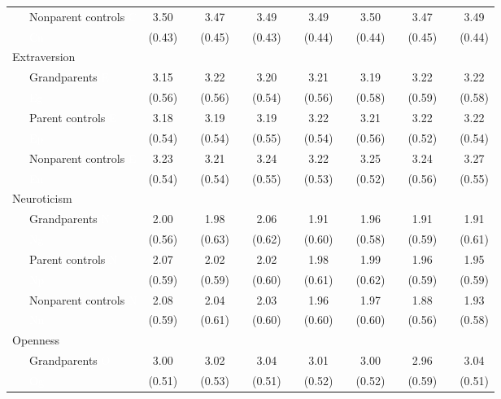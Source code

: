 \documentclass[
  english,
  man, noextraspace,floatsintext]{apa7}
\newenvironment{lltable}{\begin{landscape}\begin{center}\begin{ThreePartTable}}{\end{ThreePartTable}\end{center}\end{landscape}}
\begin{document}
\begin{appendix}
\begin{lltable}
{\begin{longtable}{lccccccccccccc}
\ \ \ Nonparent controls \textcolor{white}{C} & 3.50 &  & 3.47 &  & 3.49 &  & 3.49 &  & 3.50 &  & 3.47 &  & 3.49\\
\ \ \ \textcolor{white}{Cn} & (0.43) &  & (0.45) &  & (0.43) &  & (0.44) &  & (0.44) &  & (0.45) &  & (0.44)\\
Extraversion &  &  &  &  &  &  &  &  &  &  &  &  & \\
\ \ \ Grandparents \textcolor{white}{E} & 3.15 &  & 3.22 &  & 3.20 &  & 3.21 &  & 3.19 &  & 3.22 &  & 3.22\\
\ \ \ \textcolor{white}{Eg} & (0.56) &  & (0.56) &  & (0.54) &  & (0.56) &  & (0.58) &  & (0.59) &  & (0.58)\\
\ \ \ Parent controls \textcolor{white}{E} & 3.18 &  & 3.19 &  & 3.19 &  & 3.22 &  & 3.21 &  & 3.22 &  & 3.22\\
\ \ \ \textcolor{white}{Ep} & (0.54) &  & (0.54) &  & (0.55) &  & (0.54) &  & (0.56) &  & (0.52) &  & (0.54)\\
\ \ \ Nonparent controls \textcolor{white}{E} & 3.23 &  & 3.21 &  & 3.24 &  & 3.22 &  & 3.25 &  & 3.24 &  & 3.27\\
\ \ \ \textcolor{white}{En} & (0.54) &  & (0.54) &  & (0.55) &  & (0.53) &  & (0.52) &  & (0.56) &  & (0.55)\\
Neuroticism &  &  &  &  &  &  &  &  &  &  &  &  & \\
\ \ \ Grandparents \textcolor{white}{N} & 2.00 &  & 1.98 &  & 2.06 &  & 1.91 &  & 1.96 &  & 1.91 &  & 1.91\\
\ \ \ \textcolor{white}{Ng} & (0.56) &  & (0.63) &  & (0.62) &  & (0.60) &  & (0.58) &  & (0.59) &  & (0.61)\\
\ \ \ Parent controls \textcolor{white}{N} & 2.07 &  & 2.02 &  & 2.02 &  & 1.98 &  & 1.99 &  & 1.96 &  & 1.95\\
\ \ \ \textcolor{white}{Np} & (0.59) &  & (0.59) &  & (0.60) &  & (0.61) &  & (0.62) &  & (0.59) &  & (0.59)\\
\ \ \ Nonparent controls \textcolor{white}{N} & 2.08 &  & 2.04 &  & 2.03 &  & 1.96 &  & 1.97 &  & 1.88 &  & 1.93\\
\ \ \ \textcolor{white}{Nn} & (0.59) &  & (0.61) &  & (0.60) &  & (0.60) &  & (0.60) &  & (0.56) &  & (0.58)\\
Openness &  &  &  &  &  &  &  &  &  &  &  &  & \\
\ \ \ Grandparents \textcolor{white}{O} & 3.00 &  & 3.02 &  & 3.04 &  & 3.01 &  & 3.00 &  & 2.96 &  & 3.04\\
\ \ \ \textcolor{white}{Og} & (0.51) &  & (0.53) &  & (0.51) &  & (0.52) &  & (0.52) &  & (0.59) &  & (0.51)\\

\end{longtable}}
\end{lltable}
\end{appendix}
\end{document}
